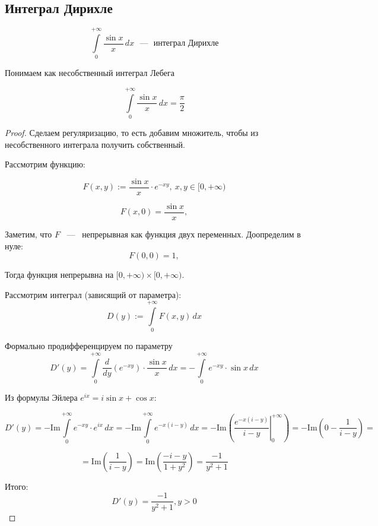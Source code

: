 \subsection{Интеграл Дирихле}

\[
    \int\limits_0^{+\infty} \frac{\sin x}{x} \, dx \text{ ~---~ интеграл Дирихле}
\]

\begin{note}
Понимаем как несобственный интеграл Лебега
\end{note}

\begin{theorem}
\[
    \int\limits_0^{+\infty} \frac{\sin x}{x} \, dx = \frac{\pi}{2}
\]

\end{theorem}

\begin{proof}

\noindent Сделаем регуляризацию, то есть добавим множитель, чтобы из несобственного интеграла получить собственный.

\noindent Рассмотрим функцию:

\[
F(x, y) := \frac{\sin x}{x} \cdot e^{-x y}, \ x, y \in [0, +\infty)
\]

\[
F(x, 0) = \frac{\sin x}{x},
\]

\noindent Заметим, что $F$ ~---~ непрерывная как функция двух переменных. Доопределим в нуле:
\[
F(0, 0) = 1,
\]

\noindent Тогда функция непрерывна на $[0, +\infty) \times [0, +\infty)$.

Рассмотрим интеграл (зависящий от параметра):
\[
D(y) := \int\limits_0^{+\infty}F(x, y) \,d x
\]


\noindent Формально продифференцируем по параметру
\[
    D'(y) = \int\limits_0^{+\infty} \frac{d}{dy} \left( e^{-x y} \right) \cdot \frac{\sin x}{x} \, dx = - \int\limits_0^{+\infty} e^{-x y} \cdot \sin x \, dx
\]

\noindent Из формулы Эйлера $e^{ix} = i \sin x + \cos x$:

\[
D'(y) = -\mathrm{Im} \int\limits_0^{+\infty} e^{-xy} \cdot e^{ix} \, dx
= -\mathrm{Im} \int\limits_0^{+\infty} e^{-x(i - y)}\, dx
= -\mathrm{Im} \left( \left. \frac{e^{-x(i - y)}}{i - y} \right|_0^{+\infty} \right) = -\mathrm{Im}\left( 0 - \frac{1}{i-y}\right) =
\]

\[
= \mathrm{Im} \left( \frac{1}{i - y} \right) = \mathrm{Im} \left( \frac{-i - y}{1 + y^2} \right)
= \frac{-1}{y^2 + 1}
\]

\noindent Итого:
\[
D'(y) = \frac{-1}{y^2 + 1}, y > 0
\]


\end{proof}
